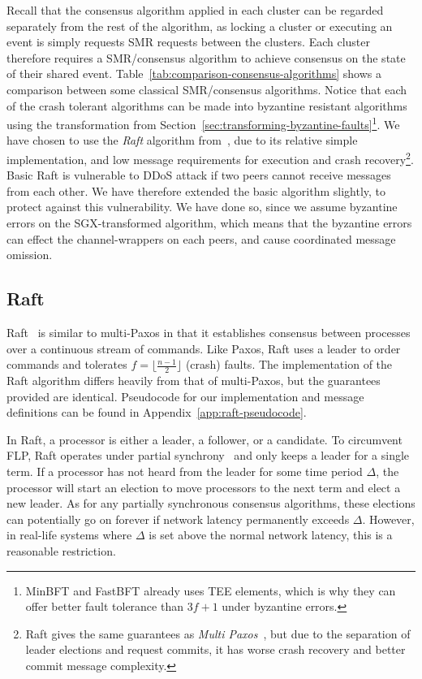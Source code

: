 \documentclass{article}
\begin{document}
    Recall that the consensus algorithm applied in each cluster can be regarded separately from the rest of the algorithm, as locking a cluster or executing an event is simply requests SMR requests between the clusters.
	Each cluster therefore requires a SMR/consensus algorithm to achieve consensus on the state of their shared event.
	Table~\ref{tab:comparison-consensus-algorithms} shows a comparison between some classical SMR/consensus algorithms.
	Notice that each of the crash tolerant algorithms can be made into byzantine resistant algorithms using the transformation from Section~\ref{sec:transforming-byzantine-faults}\footnote{MinBFT and FastBFT already uses TEE elements, which is why they can offer better fault tolerance than $3f+1$ under byzantine errors.}.
	We have chosen to use the \textit{Raft} algorithm from~\cite{ongaro_search_2014}, due to its relative simple implementation, and low message requirements for execution and crash recovery\footnote{Raft gives the same guarantees as \textit{Multi Paxos}~\cite{lamport_part-time_1998}, but due to the separation of leader elections and request commits, it has worse crash recovery and better commit message complexity.}.
	Basic Raft is vulnerable to DDoS attack if two peers cannot receive messages from each other.
	We have therefore extended the basic algorithm slightly, to protect against this vulnerability.
	We have done so, since we assume byzantine errors on the SGX-transformed algorithm, which means that the byzantine errors can effect the channel-wrappers on each peers, and cause coordinated message omission.

	\subsection{Raft}
	\label{sub:raft}

	Raft~\cite{ongaro_search_2014} is similar to multi-Paxos in that it establishes consensus between processes over a continuous stream of commands.
	Like Paxos, Raft uses a leader to order commands and tolerates $f = \lfloor \frac{n - 1}{2} \rfloor$ (crash) faults.
	The implementation of the Raft algorithm differs heavily from that of multi-Paxos, but the guarantees provided are identical.
	Pseudocode for our implementation and message definitions can be found in Appendix~\ref{app:raft-pseudocode}.

	In Raft, a processor is either a leader, a follower, or a candidate.
	To circumvent FLP, Raft operates under partial synchrony~\cite{dwork_consensus_1988} and only keeps a leader for a single term.
	If a processor has not heard from the leader for some time period $\Delta$, the processor will start an election to move processors to the next term and elect a new leader.
	As for any partially synchronous consensus algorithms, these elections can potentially go on forever if network latency permanently exceeds $\Delta$.
	However, in real-life systems where $\Delta$ is set above the normal network latency, this is a reasonable restriction.
\end{document}
